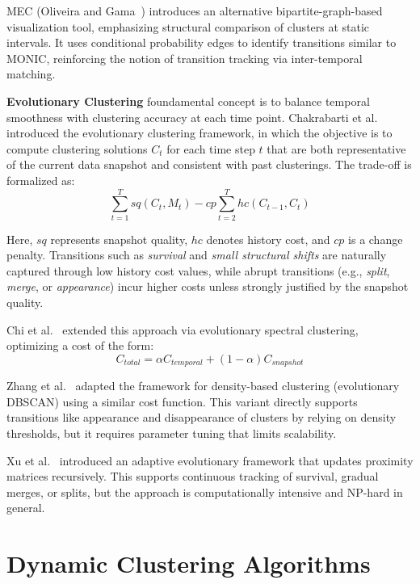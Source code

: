 \textsc{MEC} (Oliveira and Gama~\cite{mec}) introduces an alternative bipartite-graph-based visualization
tool, emphasizing structural comparison of clusters at static intervals. It uses conditional
probability edges to identify transitions similar to MONIC, reinforcing the notion of transition
tracking via inter-temporal matching.

\textbf{Evolutionary Clustering} foundamental concept is to balance temporal smoothness
with clustering accuracy at each time point. Chakrabarti et al.~\cite{evolutionary_clustering}
introduced the evolutionary clustering framework, in which the objective is to compute clustering
solutions $C_t$ for each time step $t$ that are both representative of the current data snapshot
and consistent with past clusterings. The trade-off is formalized as:
\begin{equation}
    \sum_{t=1}^T sq(C_t, M_t) - cp \sum_{t=2}^T hc(C_{t-1}, C_t)
\end{equation}

Here, $sq$ represents snapshot quality, $hc$ denotes history cost, and $cp$ is
a change penalty. Transitions such as \textit{survival} and \textit{small
    structural shifts} are naturally captured through low history cost values,
while abrupt transitions (e.g., \textit{split}, \textit{merge}, or
\textit{appearance}) incur higher costs unless strongly justified by the
snapshot quality.

Chi et al.~\cite{spectral_evolutionary_clustering} extended this approach via
evolutionary spectral clustering, optimizing a cost of the form:
\begin{equation}
    C_{total} = \alpha C_{temporal} + (1-\alpha)C_{snapshot}
\end{equation}

Zhang et al.~\cite{density_evolutionary_clustering} adapted the framework for
density-based clustering (evolutionary DBSCAN) using a similar cost function.
This variant directly supports transitions like appearance and disappearance of
clusters by relying on density thresholds, but it requires parameter tuning
that limits scalability.

Xu et al.~\cite{adaptive_evolutionary_clustering} introduced an adaptive
evolutionary framework that updates proximity matrices recursively. This
supports continuous tracking of survival, gradual merges, or splits, but the
approach is computationally intensive and NP-hard in general.

\section{Dynamic Clustering Algorithms}\label{sec:dynamic_clustering_algorithms}

